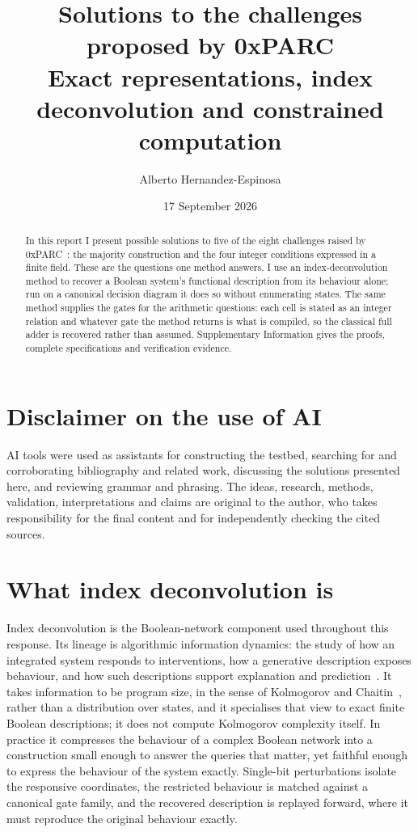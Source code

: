 \documentclass[11pt,a4paper]{article}
\title{Solutions to the challenges proposed by 0xPARC\\[5pt]
\large Exact representations, index deconvolution and constrained computation}
\author{Alberto Hernandez-Espinosa}
\date{17 September 2026}
\begin{document}
 
\maketitle
\begin{abstract}

In this report I present possible solutions to five of the eight challenges
raised by 0xPARC~\cite{challenge}: the majority construction and the four
integer conditions expressed in a finite field. These are the questions one
method answers. I use an index-deconvolution method to recover a Boolean
system's functional description from its behaviour alone; run on a canonical
decision diagram it does so without enumerating states. The same method
supplies the gates for the arithmetic questions: each cell is stated as an
integer relation and whatever gate the method returns is what is compiled, so
the classical full adder is recovered rather than assumed. Supplementary Information gives
the proofs, complete specifications and verification evidence.
\end{abstract}

\section{Disclaimer on the use of AI}
AI tools were used as assistants for constructing the testbed, searching for
and corroborating bibliography and related work, discussing the solutions
presented here, and reviewing grammar and phrasing. The ideas, research,
methods, validation, interpretations and claims are original to the author,
who takes responsibility for the final content and for independently checking
the cited sources.

\section{What index deconvolution is}
\label{sec:index-capability}

Index deconvolution is the Boolean-network component used throughout this
response. Its lineage is algorithmic information dynamics: the study of how an
integrated system responds to interventions, how a generative description
exposes behaviour, and how such descriptions support explanation and
prediction~\cite{hernandez2019aid,hernandez2021aid}. It takes information to be
program size, in the sense of Kolmogorov and
Chaitin~\cite{kolmogorov1965,chaitin1966,li2019}, rather than a distribution
over states, and it specialises that view to exact finite Boolean descriptions;
it does not compute Kolmogorov complexity itself. In practice it compresses the
behaviour of a complex Boolean network into a construction small enough to
answer the queries that matter, yet faithful enough to express the behaviour of
the system exactly. Single-bit perturbations isolate the responsive
coordinates, the restricted behaviour is matched against a canonical gate
family, and the recovered description is replayed forward, where it must
reproduce the original behaviour exactly.
\end{document}
